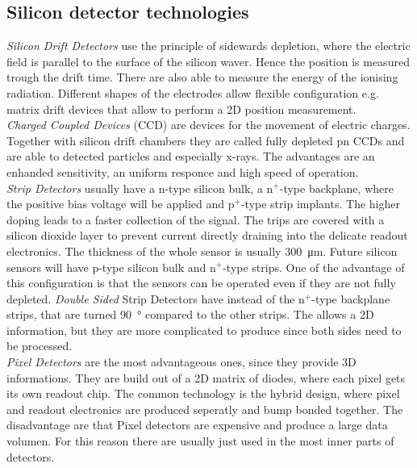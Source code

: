 \subsection{Silicon detector technologies}
\textit{Silicon Drift Detectors} use the principle of sidewards depletion, where the electric field is parallel to the surface of the silicon waver. Hence the position is measured trough the drift time. There are also able to measure the energy of the ionising radiation. Different shapes of the electrodes allow flexible configuration e.g. matrix drift devices that allow to perform a 2D position measurement.\\
\textit{Charged Coupled Devices} (CCD) are devices for the movement of electric charges. Together with silicon drift chambers they are called fully depleted pn CCDs and are able to detected particles and especially x-rays. The advantages are an enhanded sensitivity, an uniform responce and high speed of operation.\\
\textit{Strip Detectors} usually have a n-type silicon bulk, a $\text{n}^+$-type backplane, where the positive bias voltage will be applied and $\text{p}^+$-type strip implants. The higher doping leads to a faster collection of the signal. The trips are covered with a silicon dioxide layer to prevent current directly draining into the delicate readout electronics. The thickness of the whole sensor is usually \SI{300}{\micro\meter}. Future silicon sensors will have p-type silicon bulk and $\text{n}^+$-type strips. One of the advantage of this configuration is that the sensors can be operated even if they are not fully depleted. \textit{Double Sided} Strip Detectors have instead of the $\text{n}^+$-type backplane strips, that are turned \SI{90}{\degree} compared to the other strips. The allows a 2D information, but they are more complicated to produce since both sides need to be processed.\\
\textit{Pixel Detectors} are the most advantageous ones, since they provide 3D informations. They are build out of a 2D matrix of diodes, where each pixel gets its own readout chip. The common technology is the hybrid design, where pixel and readout electronics are produced seperatly and bump bonded together. The disadvantage are that Pixel detectors are expensive and produce a large data volumen. For this reason there are usually just used in the most inner parts of detectors. 
